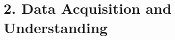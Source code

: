 \documentclass[ignorenonframetext,]{beamer}
\providecommand{\tightlist}{%
  \setlength{\itemsep}{0pt}\setlength{\parskip}{0pt}}
\begin{document}





\section{2. Data Acquisition and Understanding}\label{data-acquisition-and-understanding}
\end{document}
